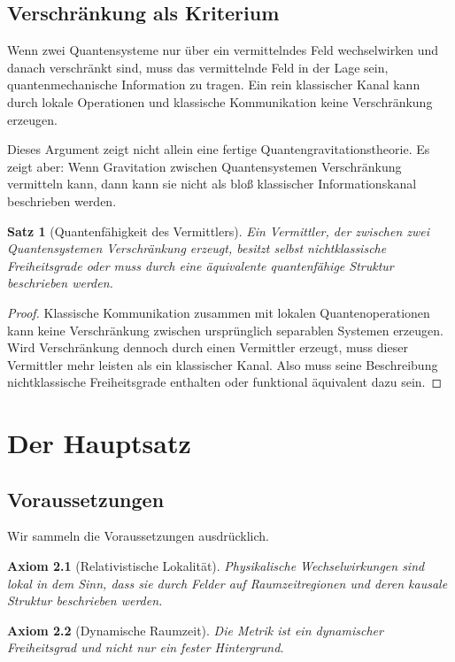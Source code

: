\documentclass[11pt,a4paper]{book}
\newtheorem{satz}{Satz}[chapter]
\newtheorem{axiom}{Axiom}[chapter]
\theoremstyle{remark}
\begin{document}
\section{Verschränkung als Kriterium}
Wenn zwei Quantensysteme nur über ein vermittelndes Feld wechselwirken und danach verschränkt sind, muss das vermittelnde Feld in der Lage sein, quantenmechanische Information zu tragen. Ein rein klassischer Kanal kann durch lokale Operationen und klassische Kommunikation keine Verschränkung erzeugen.

Dieses Argument zeigt nicht allein eine fertige Quantengravitationstheorie. Es zeigt aber: Wenn Gravitation zwischen Quantensystemen Verschränkung vermitteln kann, dann kann sie nicht als bloß klassischer Informationskanal beschrieben werden.

\begin{satz}[Quantenfähigkeit des Vermittlers]
Ein Vermittler, der zwischen zwei Quantensystemen Verschränkung erzeugt, besitzt selbst nichtklassische Freiheitsgrade oder muss durch eine äquivalente quantenfähige Struktur beschrieben werden.
\end{satz}

\begin{proof}
Klassische Kommunikation zusammen mit lokalen Quantenoperationen kann keine Verschränkung zwischen ursprünglich separablen Systemen erzeugen. Wird Verschränkung dennoch durch einen Vermittler erzeugt, muss dieser Vermittler mehr leisten als ein klassischer Kanal. Also muss seine Beschreibung nichtklassische Freiheitsgrade enthalten oder funktional äquivalent dazu sein.
\end{proof}

\chapter{Der Hauptsatz}
\section{Voraussetzungen}
Wir sammeln die Voraussetzungen ausdrücklich.

\begin{axiom}[Relativistische Lokalität]
Physikalische Wechselwirkungen sind lokal in dem Sinn, dass sie durch Felder auf Raumzeitregionen und deren kausale Struktur beschrieben werden.
\end{axiom}

\begin{axiom}[Dynamische Raumzeit]
Die Metrik ist ein dynamischer Freiheitsgrad und nicht nur ein fester Hintergrund.
\end{axiom}
\end{document}
